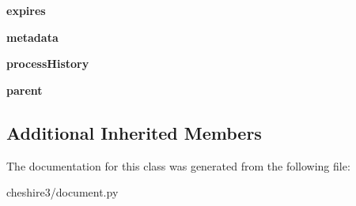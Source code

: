 \begin{DoxyCompactItemize}
\item 
\hypertarget{classcheshire3_1_1document_1_1_string_document_af0ddc9f99eb57abd1dbed2a709ff8d29}{{\bfseries expires}}\label{classcheshire3_1_1document_1_1_string_document_af0ddc9f99eb57abd1dbed2a709ff8d29}

\item 
\hypertarget{classcheshire3_1_1document_1_1_string_document_a2256a83b1f260c09404a00ba29ca81a0}{{\bfseries metadata}}\label{classcheshire3_1_1document_1_1_string_document_a2256a83b1f260c09404a00ba29ca81a0}

\item 
\hypertarget{classcheshire3_1_1document_1_1_string_document_a0b04d727741b444cb63939ef08df7f8e}{{\bfseries process\-History}}\label{classcheshire3_1_1document_1_1_string_document_a0b04d727741b444cb63939ef08df7f8e}

\item 
\hypertarget{classcheshire3_1_1document_1_1_string_document_a956873389fc0e678298ee75bfe051cea}{{\bfseries parent}}\label{classcheshire3_1_1document_1_1_string_document_a956873389fc0e678298ee75bfe051cea}

\end{DoxyCompactItemize}
\subsection*{Additional Inherited Members}


The documentation for this class was generated from the following file\-:\begin{DoxyCompactItemize}
\item 
cheshire3/document.\-py\end{DoxyCompactItemize}
